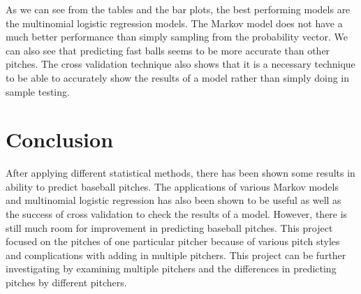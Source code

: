 \documentclass{article}
\begin{document}
\noindent As we can see from the tables and the bar plots, the best performing models are the multinomial logistic regression models. The Markov model does not have a much better performance than simply sampling from the probability vector. We can also see that predicting fast balls seems to be more accurate than other pitches. The cross validation technique also shows that it is a necessary technique to be able to accurately show the results of a model rather than simply doing in sample testing. 

\section{Conclusion}

After applying different statistical methods, there has been shown some results in ability to predict baseball pitches. The applications of various Markov models and multinomial logistic regression has also been shown to be useful as well as the success of cross validation to check the results of a model. However, there is still much room for improvement in predicting baseball pitches. This project focused on the pitches of one particular pitcher because of various pitch styles and complications with adding in multiple pitchers. This project can be further investigating by examining multiple pitchers and the differences in predicting pitches by different pitchers. 
\end{document}
